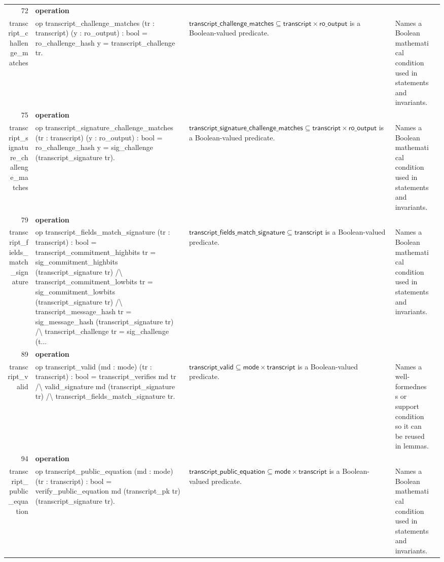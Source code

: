 \documentclass[10pt]{article}
\newcommand{\ec}[1]{\begingroup\ttfamily\scriptsize #1\endgroup}
\begin{document}
\begin{longtable}{r L{0.17\textwidth} L{0.26\textwidth} L{0.27\textwidth} L{0.20\textwidth}}
72 & \textbf{operation}\\\ec{transcript\_challenge\_matches} & \ec{op transcript\_challenge\_matches (tr : transcript) (y : ro\_output) : bool = ro\_challenge\_hash y = transcript\_challenge tr.} & \(\mathsf{transcript\_challenge\_matches} \subseteq \mathsf{transcript} \times \mathsf{ro\_output}\) is a Boolean-valued predicate. & Names a Boolean mathematical condition used in statements and invariants. \\
75 & \textbf{operation}\\\ec{transcript\_signature\_challenge\_matches} & \ec{op transcript\_signature\_challenge\_matches (tr : transcript) (y : ro\_output) : bool = ro\_challenge\_hash y = sig\_challenge (transcript\_signature tr).} & \(\mathsf{transcript\_signature\_challenge\_matches} \subseteq \mathsf{transcript} \times \mathsf{ro\_output}\) is a Boolean-valued predicate. & Names a Boolean mathematical condition used in statements and invariants. \\
79 & \textbf{operation}\\\ec{transcript\_fields\_match\_signature} & \ec{op transcript\_fields\_match\_signature (tr : transcript) : bool = transcript\_commitment\_highbits tr = sig\_commitment\_highbits (transcript\_signature tr) /\textbackslash{} transcript\_commitment\_lowbits tr = sig\_commitment\_lowbits (transcript\_signature tr) /\textbackslash{} transcript\_message\_hash tr = sig\_message\_hash (transcript\_signature tr) /\textbackslash{} transcript\_challenge tr = sig\_challenge (t...} & \(\mathsf{transcript\_fields\_match\_signature} \subseteq \mathsf{transcript}\) is a Boolean-valued predicate. & Names a Boolean mathematical condition used in statements and invariants. \\
89 & \textbf{operation}\\\ec{transcript\_valid} & \ec{op transcript\_valid (md : mode) (tr : transcript) : bool = transcript\_verifies md tr /\textbackslash{} valid\_signature md (transcript\_signature tr) /\textbackslash{} transcript\_fields\_match\_signature tr.} & \(\mathsf{transcript\_valid} \subseteq \mathsf{mode} \times \mathsf{transcript}\) is a Boolean-valued predicate. & Names a well-formedness or support condition so it can be reused in lemmas. \\
94 & \textbf{operation}\\\ec{transcript\_public\_equation} & \ec{op transcript\_public\_equation (md : mode) (tr : transcript) : bool = verify\_public\_equation md (transcript\_pk tr) (transcript\_signature tr).} & \(\mathsf{transcript\_public\_equation} \subseteq \mathsf{mode} \times \mathsf{transcript}\) is a Boolean-valued predicate. & Names a Boolean mathematical condition used in statements and invariants. \\

\end{longtable}
\end{document}

